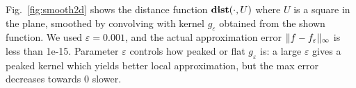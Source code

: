 Fig.~\ref{fig:smooth2d} shows the distance function $\mathbf{dist}(\cdot,U)$ where $U$ is a square in the plane, smoothed by convolving with kernel $g_{\varepsilon}$ obtained from the shown function. 
We used $\varepsilon = 0.001$, and the actual approximation error $\|f-f_\varepsilon\|_\infty$ is less than 1e-15.
Parameter $\varepsilon$ controls how peaked or flat $g_\varepsilon$ is: a large $\varepsilon$ gives a peaked kernel which yields better local approximation, but the max error decreases towards 0 slower.


